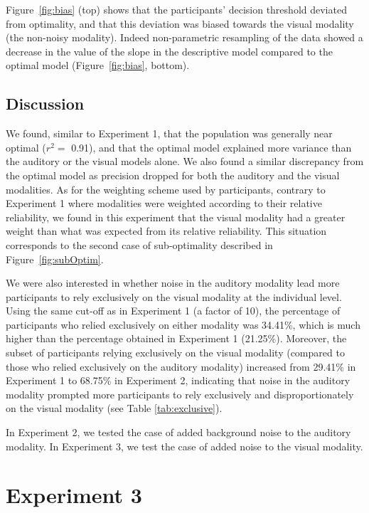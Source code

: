\documentclass[english,floatsintext,man]{apa6}
\theoremstyle{definition}
\theoremstyle{definition}
\theoremstyle{definition}
\theoremstyle{remark}
\begin{document}
Figure~\ref{fig:bias} (top) shows that the participants' decision
threshold deviated from optimality, and that this deviation was biased
towards the visual modality (the non-noisy modality). Indeed
non-parametric resampling of the data showed a decrease in the value of
the slope in the descriptive model compared to the optimal model
(Figure~\ref{fig:bias}, bottom).

\subsection{Discussion}\label{discussion-1}

We found, similar to Experiment 1, that the population was generally
near optimal (\(r^2 =\) 0.91), and that the optimal model explained more
variance than the auditory or the visual models alone. We also found a
similar discrepancy from the optimal model as precision dropped for both
the auditory and the visual modalities. As for the weighting scheme used
by participants, contrary to Experiment 1 where modalities were weighted
according to their relative reliability, we found in this experiment
that the visual modality had a greater weight than what was expected
from its relative reliability. This situation corresponds to the second
case of sub-optimality described in Figure~\ref{fig:subOptim}.

We were also interested in whether noise in the auditory modality lead
more participants to rely exclusively on the visual modality at the
individual level. Using the same cut-off as in Experiment 1 (a factor of
10), the percentage of participants who relied exclusively on either
modality was 34.41\%, which is much higher than the percentage obtained
in Experiment 1 (21.25\%). Moreover, the subset of participants relying
exclusively on the visual modality (compared to those who relied
exclusively on the auditory modality) increased from 29.41\% in
Experiment 1 to 68.75\% in Experiment 2, indicating that noise in the
auditory modality prompted more participants to rely exclusively and
disproportionately on the visual modality (see Table
\ref{tab:exclusive}).

In Experiment 2, we tested the case of added background noise to the
auditory modality. In Experiment 3, we test the case of added noise to
the visual modality.

\section{Experiment 3}\label{experiment-3}
\end{document}
